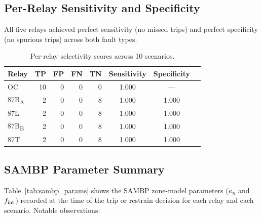 \documentclass[12pt,a4paper]{article}
\newcommand{\kn}{\kappa_n}
\newcommand{\fint}{f_{\rm int}}
\begin{document}
\subsection{Per-Relay Sensitivity and Specificity}

All five relays achieved perfect sensitivity (no missed trips) and
perfect specificity (no spurious trips) across both fault types.

\begin{table}[H]
  \centering
  \caption{Per-relay selectivity scores across 10 scenarios.}
  \label{tab:relay_scores}
  \begin{tabular}{lrrrrccc}
    \toprule
    Relay & TP & FP & FN & TN & Sensitivity & Specificity \\
    \midrule
    OC                  & 10 & 0 & 0 & 0 & 1.000 & --- \\
    87B\textsubscript{A} & 2 & 0 & 0 & 8 & 1.000 & 1.000 \\
    87L                  & 2 & 0 & 0 & 8 & 1.000 & 1.000 \\
    87B\textsubscript{B} & 2 & 0 & 0 & 8 & 1.000 & 1.000 \\
    87T                  & 2 & 0 & 0 & 8 & 1.000 & 1.000 \\
    \bottomrule
  \end{tabular}
\end{table}

\subsection{SAMBP Parameter Summary}

Table~\ref{tab:sambp_params} shows the SAMBP zone-model parameters
($\kn$ and $\fint$) recorded at the time of the trip or restrain
decision for each relay and each scenario.  Notable observations:
\end{document}
